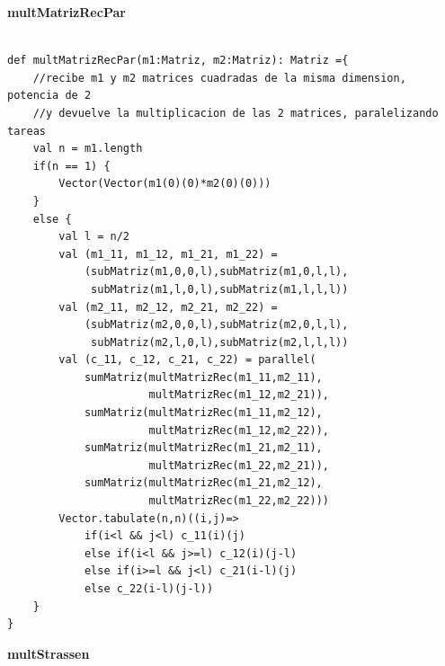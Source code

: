 \documentclass[12pt, a4paper]{article}
\begin{document}
\textbf{{multMatrizRecPar}} \\ \\
\begin{lstlisting}[caption=mult matriz recursiva paralela, label=lst:scala_code9]
def multMatrizRecPar(m1:Matriz, m2:Matriz): Matriz ={
    //recibe m1 y m2 matrices cuadradas de la misma dimension, potencia de 2
    //y devuelve la multiplicacion de las 2 matrices, paralelizando tareas
    val n = m1.length
    if(n == 1) {
        Vector(Vector(m1(0)(0)*m2(0)(0)))
    }
    else {
        val l = n/2
        val (m1_11, m1_12, m1_21, m1_22) = 
            (subMatriz(m1,0,0,l),subMatriz(m1,0,l,l),
             subMatriz(m1,l,0,l),subMatriz(m1,l,l,l))
        val (m2_11, m2_12, m2_21, m2_22) =
            (subMatriz(m2,0,0,l),subMatriz(m2,0,l,l),
             subMatriz(m2,l,0,l),subMatriz(m2,l,l,l))
        val (c_11, c_12, c_21, c_22) = parallel(
            sumMatriz(multMatrizRec(m1_11,m2_11),
                      multMatrizRec(m1_12,m2_21)),
            sumMatriz(multMatrizRec(m1_11,m2_12),
                      multMatrizRec(m1_12,m2_22)),
            sumMatriz(multMatrizRec(m1_21,m2_11),
                      multMatrizRec(m1_22,m2_21)),
            sumMatriz(multMatrizRec(m1_21,m2_12),
                      multMatrizRec(m1_22,m2_22)))
        Vector.tabulate(n,n)((i,j)=>
            if(i<l && j<l) c_11(i)(j)
            else if(i<l && j>=l) c_12(i)(j-l)
            else if(i>=l && j<l) c_21(i-l)(j)
            else c_22(i-l)(j-l))
    }
}
\end{lstlisting}
\textbf{{multStrassen}} \\ \\
\end{document}
